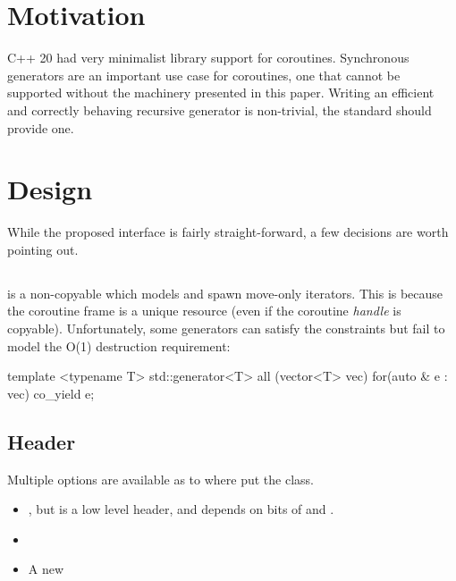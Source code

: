 \documentclass{wg21}
\begin{document}
\section{Motivation}

C++ 20 had very minimalist library support for coroutines.
Synchronous generators are an important use case for coroutines, one that cannot be supported without 
the machinery presented in this paper.
Writing an efficient and correctly behaving recursive generator is non-trivial, the standard should provide one.


\section{Design}

While the proposed  interface is fairly straight-forward, a few decisions are worth pointing out.

\subsection{}

 is a non-copyable  which models  and spawn move-only iterators.
This is because the coroutine frame is a unique resource (even if the coroutine \textit{handle} is copyable).
Unfortunately, some generators can satisfy the  constraints but fail to model the  O(1) 
destruction requirement:

\begin{colorblock}
    
    template <typename T>
    std::generator<T> all (vector<T> vec) {
        for(auto & e : vec)  {
            co_yield e;
        }
    }
    
\end{colorblock}



\subsection{Header}

Multiple options are available as to where put the  class.

\begin{itemize}
    \item {}, but  is a low level header, and  depends on bits of  and .
    
    \item {}
    
    \item A new 
    
\end{itemize}
\end{document}
